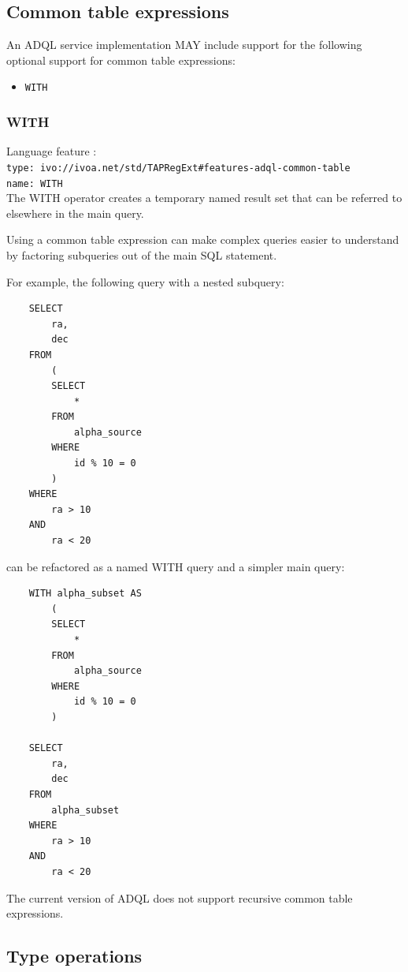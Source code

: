 \documentclass[11pt,a4paper]{ivoa}
\begin{document}
\subsection{Common table expressions}
\label{sec:common-table}

An ADQL service implementation MAY include support for the following optional
support for common table expressions:

\begin{itemize}
    \item \verb:WITH:
\end{itemize}

\subsubsection{WITH}
{\footnotesize Language feature :}\\
{\footnotesize \verb|type: ivo://ivoa.net/std/TAPRegExt#features-adql-common-table|}\\
{\footnotesize \verb|name: WITH|}\\

The WITH operator creates a temporary named result set that can be referred
to elsewhere in the main query.

Using a common table expression can make complex queries easier to understand
by factoring subqueries out of the main SQL statement.

For example, the following query with a nested subquery: 
\begin{verbatim}
    SELECT
        ra,
        dec
    FROM
        (
        SELECT
            *
        FROM
            alpha_source
        WHERE
            id % 10 = 0
        )
    WHERE
        ra > 10
    AND 
        ra < 20
\end{verbatim}
\noindent
can be refactored as a named WITH query and a simpler main query:
\begin{verbatim}
    WITH alpha_subset AS
        (
        SELECT
            *
        FROM
            alpha_source
        WHERE
            id % 10 = 0
        )

    SELECT
        ra,
        dec
    FROM
        alpha_subset
    WHERE
        ra > 10
    AND 
        ra < 20
\end{verbatim}

The current version of ADQL does not support recursive common table expressions.

\subsection{Type operations}
\label{sec:type}
\end{document}
